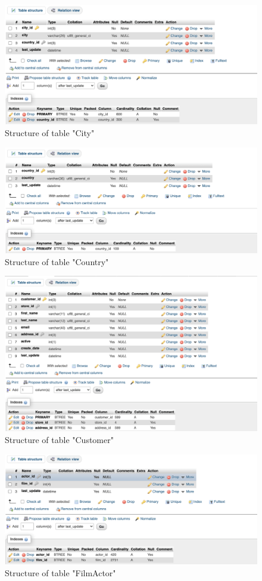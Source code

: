 \documentclass{article}
\begin{document}
	\begin{figure}[H]
		\includegraphics[width=\textwidth]{table_city_struct}
		\caption{Structure of table "City"}	
	\end{figure}
	\begin{figure}[H]
		\includegraphics[width=\textwidth]{table_country_struct}
		\caption{Structure of table "Country"}	
	\end{figure}
	\begin{figure}[H]
		\includegraphics[width=\textwidth]{table_customer_struct}
		\caption{Structure of table "Customer"}	
	\end{figure}
	\begin{figure}[H]
		\includegraphics[width=\textwidth]{table_filmactor_struct}
		\caption{Structure of table "Film\textunderscore Actor"}	
	\end{figure}
\end{document}
